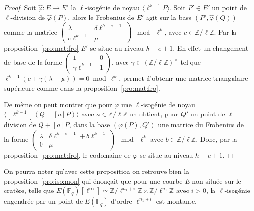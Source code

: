 \documentclass[10pt,a4paper]{book}
\theoremstyle{plain}
\theoremstyle{definition}
\theoremstyle{definition}
\theoremstyle{definition}
\theoremstyle{definition}
\theoremstyle{remark}
\theoremstyle{remark}
\theoremstyle{definition}
\begin{document}
\begin{proof}
Soit $\widehat{\varphi}:E\to E'$ la $\ell$-isogénie de noyau $\langle \ell^{k-1}P 
\rangle$.
Soit $P'\in E'$ un point de $\ell$-division de $\widehat{\varphi}(P)$, alors 
le Frobenius de $E'$ agit sur la base 
$( P',\widehat{\varphi}(Q) )$ comme la matrice $\left( \begin{smallmatrix} \lambda 
& \delta \ell^{h-e+1} \\ c \ell^{k-1} & \mu \end{smallmatrix} \right)~\bmod~\ell^k$, 
avec $c \in \mathbb{Z}/\ell \mathbb{Z}$. Par la 
proposition~\ref{pro:mat:fro} $E'$ se 
 situe au niveau $h-e+1$. En effet un changement de base de la forme $\left( 
\begin{smallmatrix} 1 & 0 \\ \gamma \ell^{k-1} & 1 \end{smallmatrix} \right)$, 
 avec $\gamma \in (\mathbb{Z}/\ell \mathbb{Z})^{\times}$ tel que $\ell^{k-1}(c+
\gamma (\lambda -\mu))=0 \bmod \ell^k$, permet d'obtenir une matrice 
triangulaire supérieure comme dans la
proposition~\ref{pro:mat:fro}.

De même on peut montrer que pour $\varphi$ une $\ell$-isogénie de noyau 
$\langle [\ell^{k-1}](Q+[a]P) \rangle$ avec $a \in \mathbb{Z}/\ell \mathbb{Z}$ 
on obtient, pour $Q'$ un point de $\ell$-division de $Q+[a]P$, dans la base 
$(\varphi(P), Q')$ une matrice du Frobenius de la forme $\left( 
\begin{smallmatrix} \lambda & \delta \ell^{h-e-1}+b\ell^{k-1} \\ 0 & \mu 
\end{smallmatrix} \right)~\bmod~\ell^k$ avec $b \in \mathbb{Z}/\ell 
\mathbb{Z}$.  Donc, par la proposition~\ref{pro:mat:fro}, le codomaine de 
$\varphi$ se situe au niveau $h-e+1$.
\end{proof}


On pourra noter qu'avec cette proposition on retrouve bien la 
proposition~\ref{pro:iso:mon} qui énonçait que pour une courbe $E$ non située
sur le cratère, telle que $E(\mathbb{F}_q)[\ell^{\infty}]\simeq 
\mathbb{Z}/\ell^{n_1+i} \mathbb{Z} \times \mathbb{Z}/\ell^{n_1} \mathbb{Z}$ 
avec $i>0$, la $\ell$-isogénie engendrée par un point de $E(\mathbb{F}_q)$ 
d'ordre $\ell^{n_1+i}$ est montante.
\end{document}
